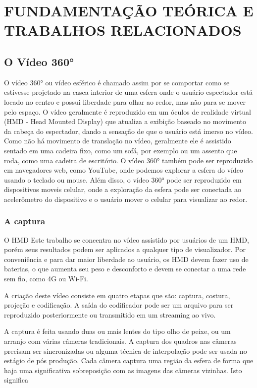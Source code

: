 
\chapter{FUNDAMENTAÇÃO TEÓRICA E TRABALHOS RELACIONADOS}\label{Cap:Foundations}

\section{O Vídeo 360°}

O vídeo 360° ou vídeo esférico é chamado assim por se comportar como se estivesse projetado na casca interior de uma esfera onde o usuário espectador está locado no centro e possui liberdade para olhar ao redor, mas não para se mover pelo espaço. O vídeo geralmente é reproduzido em um óculos de realidade virtual (HMD - Head Mounted Display) que atualiza a exibição baseado no movimento da cabeça do espectador, dando a sensação de que o usuário está imerso no vídeo. Como não há movimento de translação no vídeo, geralmente ele é assistido sentado em uma cadeira fixo, como um sofá, por exemplo ou um assento que roda, como uma cadeira de escritório. O vídeo 360° também pode ser reproduzido em navegadores web, como YouTube, onde podemos explorar a esfera do vídeo usando o teclado ou mouse. Além disso, o vídeo 360° pode ser reproduzido em dispositivos moveis celular, onde a exploração da esfera pode ser conectada ao acelerômetro do dispositivo e o usuário mover o celular para visualizar ao redor.



\subsection{A captura}



O HMD
Este trabalho se concentra no vídeo assistido por usuários de um HMD, porém seus resultados podem ser aplicados a qualquer tipo de visualizador. Por conveniência e para dar maior liberdade ao usuário, os HMD devem fazer uso de baterias, o que aumenta seu peso e desconforto e devem se conectar a uma rede sem fio, como 4G ou Wi-Fi.


A criação deste vídeo consiste em quatro etapas que são: captura, costura, projeção e codificação. A saída do codificador pode ser um arquivo para ser reproduzido posteriormente ou transmitido em um streaming ao vivo.

A captura é feita usando duas ou mais lentes do tipo olho de peixe, ou um arranjo com várias câmeras tradicionais. A captura dos quadros nas câmeras precisam ser sincronizadas ou alguma técnica de interpolação pode ser usada no estágio de pós produção. Cada câmera captura uma região da esfera de forma que haja uma significativa sobreposição com as imagens das câmeras vizinhas. Isto significa




